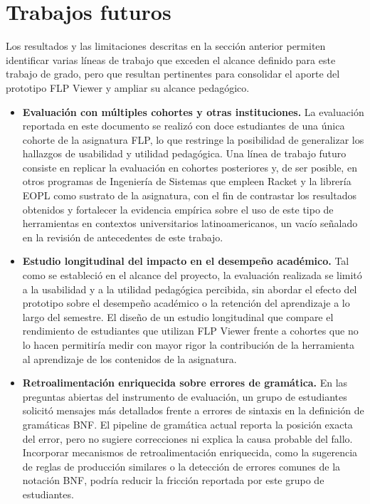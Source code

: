 \section{Trabajos futuros}
\label{sec:trabajos-futuros}

Los resultados y las limitaciones descritas en la sección anterior permiten identificar varias líneas de trabajo que exceden el alcance definido para este trabajo de grado, pero que resultan pertinentes para consolidar el aporte del prototipo FLP Viewer y ampliar su alcance pedagógico.

\begin{itemize}

\item \textbf{Evaluación con múltiples cohortes y otras instituciones.} La evaluación reportada en este documento se realizó con doce estudiantes de una única cohorte de la asignatura FLP, lo que restringe la posibilidad de generalizar los hallazgos de usabilidad y utilidad pedagógica. Una línea de trabajo futuro consiste en replicar la evaluación en cohortes posteriores y, de ser posible, en otros programas de Ingeniería de Sistemas que empleen Racket y la librería EOPL como sustrato de la asignatura, con el fin de contrastar los resultados obtenidos y fortalecer la evidencia empírica sobre el uso de este tipo de herramientas en contextos universitarios latinoamericanos, un vacío señalado en la revisión de antecedentes de este trabajo.

\item \textbf{Estudio longitudinal del impacto en el desempeño académico.} Tal como se estableció en el alcance del proyecto, la evaluación realizada se limitó a la usabilidad y a la utilidad pedagógica percibida, sin abordar el efecto del prototipo sobre el desempeño académico o la retención del aprendizaje a lo largo del semestre. El diseño de un estudio longitudinal que compare el rendimiento de estudiantes que utilizan FLP Viewer frente a cohortes que no lo hacen permitiría medir con mayor rigor la contribución de la herramienta al aprendizaje de los contenidos de la asignatura.

\item \textbf{Retroalimentación enriquecida sobre errores de gramática.} En las preguntas abiertas del instrumento de evaluación, un grupo de estudiantes solicitó mensajes más detallados frente a errores de sintaxis en la definición de gramáticas BNF. El pipeline de gramática actual reporta la posición exacta del error, pero no sugiere correcciones ni explica la causa probable del fallo. Incorporar mecanismos de retroalimentación enriquecida, como la sugerencia de reglas de producción similares o la detección de errores comunes de la notación BNF, podría reducir la fricción reportada por este grupo de estudiantes.


\end{itemize}

